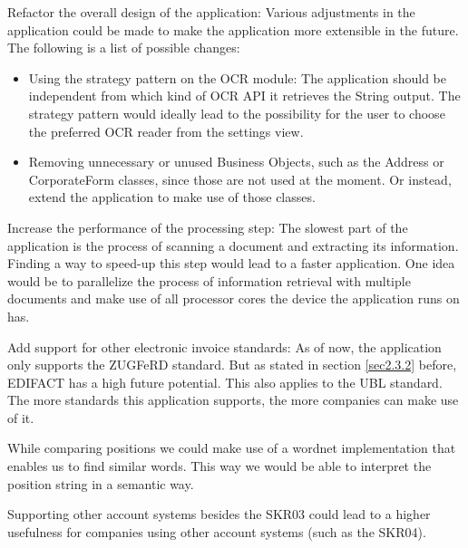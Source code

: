Refactor the overall design of the application: Various adjustments in the application could be made to make the application more extensible in the future. The following is a list of possible changes:
	\begin{itemize}
		\item Using the strategy pattern on the OCR module: The application should be independent from which kind of OCR API it retrieves the String output. The strategy pattern would ideally lead to the possibility for the user to choose the preferred OCR reader from the settings view.
		\item Removing unnecessary or unused Business Objects, such as the Address or CorporateForm classes, since those are not used at the moment. Or instead, extend the application to make use of those classes.
	\end{itemize}

Increase the performance of the processing step: The slowest part of the application is the process of scanning a document and extracting its information. Finding a way to speed-up this step would lead to a faster application. One idea would be to parallelize the process of information retrieval with multiple documents and make use of all processor cores the device the application runs on has.

Add support for other electronic invoice standards: As of now, the application only supports the ZUGFeRD standard. But as stated in section \ref{sec2.3.2} before, EDIFACT has a high future potential. This also applies to the UBL standard. The more standards this application supports, the more companies can make use of it.

While comparing positions we could make use of a wordnet implementation that enables us to find similar words. This way we would be able to interpret the position string in a semantic way.

Supporting other account systems besides the SKR03 could lead to a higher usefulness for companies using other account systems (such as the SKR04).
